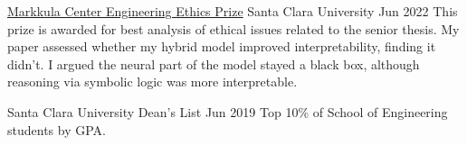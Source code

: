 \vspace{\sectionpadding}
\entry
    {\href{https://www.scu.edu/ethics/focus-areas/campus-ethics/programs-for-students/co-curricular-activities/ethics-prizes/}{Markkula Center Engineering Ethics Prize}}
    {Santa Clara University}
    {Jun 2022}
    {This prize is awarded for best analysis of ethical issues related to the senior thesis. My paper assessed whether my hybrid model improved interpretability, finding it didn’t. I argued the neural part of the model stayed a black box, although reasoning via symbolic logic was more interpretable.}

\entry 
    {Santa Clara University Dean's List}
    {}
    {Jun 2019}
    {Top 10\% of School of Engineering students by GPA.}